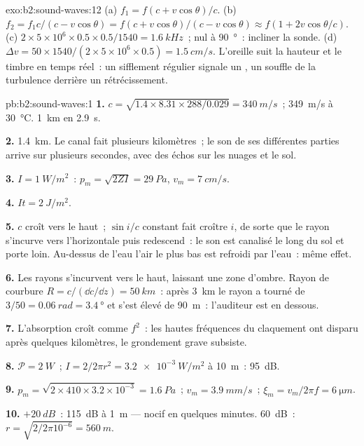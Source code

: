 \begin{solution}{exo:b2:sound-waves:12}
(a) $f_1 = f(c + v\cos\theta)/c$. (b) $f_2 = f_1c/(c - v\cos\theta) = f(c + v\cos\theta)
/(c - v\cos\theta) \approx f(1 + 2v\cos\theta/c)$. (c) $2 \times 5 \times 10^6 \times 0.5 \times 0.5/1540
= \qty{1.6}{kHz}$~; nul à \qty{90}{\degree}~: incliner la sonde. (d) $\Delta v = 50 \times 1540/
(2 \times 5 \times 10^6 \times 0.5) = \qty{1.5}{cm/s}$. L'oreille suit la hauteur et le timbre en
temps réel~: un sifflement régulier signale un , un souffle de la turbulence
derrière un rétrécissement.
\end{solution}

\begin{solution}{pb:b2:sound-waves:1}
\textbf{1.} $c = \sqrt{1.4 \times 8.31 \times 288/0.029} = \qty{340}{m/s}$~; \qty{349}{m/s}
à \qty{30}{\degreeCelsius}. \qty{1}{km} en \qty{2.9}{s}.

\textbf{2.} \qty{1.4}{km}. Le canal fait plusieurs kilomètres~; le son de
ses différentes parties arrive sur plusieurs secondes, avec des échos sur les nuages et
le sol.

\textbf{3.} $I = \qty{1}{W/m^2}$~: $p_m = \sqrt{2ZI} = \qty{29}{Pa}$, $v_m = \qty{7}{cm/s}$.

\textbf{4.} $It = \qty{2}{J/m^2}$.

\textbf{5.} $c$ croît vers le haut~; $\sin i/c$ constant fait croître $i$, de sorte que le
rayon s'incurve vers l'horizontale puis redescend~: le son est canalisé
le long du sol et porte loin. Au-dessus de l'eau l'air le plus bas est refroidi
par l'eau~: même effet.

\textbf{6.} Les rayons s'incurvent vers le haut, laissant une zone d'ombre. Rayon de
courbure $R = c/(\dd c/\dd z) = \qty{50}{km}$~: après \qty{3}{km} le rayon a
tourné de $3/50 = \qty{0.06}{rad} = \qty{3.4}{\degree}$ et s'est élevé de \qty{90}{m}~: l'auditeur
est en dessous.

\textbf{7.} L'absorption croît comme $f^2$~: les hautes fréquences du claquement ont
disparu après quelques kilomètres, le grondement grave subsiste.

\textbf{8.} $\mathcal P = \qty{2}{W}$~; $I = 2/2\pi r^2 = \qty{3.2e-3}{W/m^2}$ à \qty{10}{m}~:
\qty{95}{dB}.

\textbf{9.} $p_m = \sqrt{2 \times 410 \times 3.2 \times 10^{-3}} = \qty{1.6}{Pa}$~; $v_m = \qty{3.9}{mm/s}$~;
$\xi_m = v_m/2\pi f = \qty{6}{\micro m}$.

\textbf{10.} $+\qty{20}{dB}$~: \qty{115}{dB} à \qty{1}{m} --- nocif en quelques
minutes. \qty{60}{dB}~: $r = \sqrt{2/2\pi10^{-6}} = \qty{560}{m}$.


\end{solution}
